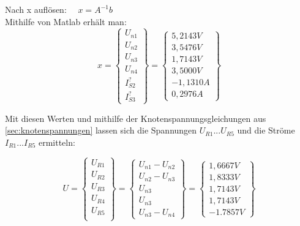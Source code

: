 \documentclass[11pt]{scrartcl}
\begin{document}
Nach x auflösen: \(\displaystyle \quad x = A^{-1} b \) \\

Mithilfe von Matlab erhält man:
\begin{equation*}
  \renewcommand{\arraystretch}{1.25}
  x = \left\{\begin{array}{c}
      U_{n1} \\
      U_{n2} \\
      U_{n3} \\
      U_{n4} \\
      I_{S2}^? \\
      I_{S3}^? \end{array}\right\} =
  \left\{ \begin{array}{c}
            5,2143 \unit{V}\\
    3,5476 \unit{V}\\
    1,7143 \unit{V}\\
    3,5000 \unit{V}\\
    -1,1310 \unit{A}\\
    0,2976 \unit{A} \end{array}\right\}
\end{equation*}

Mit diesen Werten und mithilfe der Knotenspannungsgleichungen aus \ref{sec:knotenspannungen} lassen sich die
Spannungen $U_{R1} ...  U_{R5}$ und die Ströme $I_{R1} ...  I_{R5}$ ermitteln:

\begin{equation*}
  \renewcommand{\arraystretch}{1.25}
  U = \left\{ \begin{array}{c}
                U_{R1} \\
                U_{R2} \\
                U_{R3} \\
                U_{R4} \\
                U_{R5} \\
                \end{array}
  \right\} =
  \left\{ \begin{array}{c}
                U_{n1} - U_{n2}\\
                U_{n2} - U_{n3} \\
                U_{n3} \\
                U_{n3} \\
                U_{n3} - U_{n4}
          \end{array}\right\} =
        \left\{ \begin{array}{c}
                  1,6667 \unit{V} \\
                  1,8333 \unit{V} \\
                  1,7143 \unit{V} \\
                  1,7143 \unit{V} \\
                  -1.7857 \unit{V}
                \end{array}\right\}
            \end{equation*}
\end{document}
